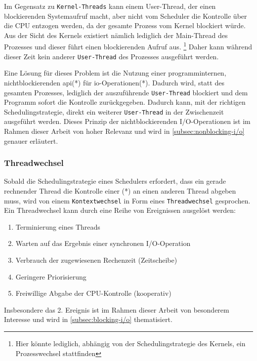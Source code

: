 Im Gegensatz zu \verb|Kernel-Threads| kann einem User-Thread, der einen blockierenden Systemaufruf macht, aber nicht vom Scheduler die Kontrolle über die CPU
entzogen werden, da der gesamte Prozess vom Kernel blockiert würde. Aus der Sicht des Kernels existiert nämlich lediglich der Main-Thread des Prozesses und dieser
führt einen blockierenden Aufruf aus. \footnote{Hier könnte lediglich, abhängig von der Schedulingstrategie des Kernels, ein Prozesswechsel stattfinden}
Daher kann während dieser Zeit kein anderer \verb|User-Thread| des Prozesses ausgeführt werden.

Eine Lösung für dieses Problem ist die Nutzung einer programminternen, nichtblockierenden \acrshort{api}(*) für \gls{io}-Operationen(*).
Dadurch wird, statt des gesamten Prozesses, lediglich der auszuführende \verb|User-Thread| blockiert und dem Programm sofort
die Kontrolle zurückgegeben. Dadurch kann, mit der richtigen Schedulingstrategie, direkt ein weiterer \verb|User-Thread| in der Zwischenzeit ausgeführt werden.
\parencite[Kapitel 2.2.4]{Tanenbaum2016}
Dieses Prinzip der nichtblockierenden I/O-Operationen ist im Rahmen dieser Arbeit von hoher Relevanz und wird in \ref{subsec:nonblocking-i/o}
genauer erläutert.

\subsubsection{Threadwechsel}
\label{subsubsec:threadwechsel}
Sobald die Schedulingstrategie eines Schedulers erfordert, dass ein gerade rechnender Thread die Kontrolle einer (*) an
einen anderen Thread abgeben muss, wird von einem \verb|Kontextwechsel| in Form eines \verb|Threadwechsel| gesprochen.
Ein Threadwechsel kann durch eine Reihe von Ereignissen ausgelöst werden:
\begin{enumerate}
  \item Terminierung eines Threads
  \item Warten auf das Ergebnis einer synchronen I/O-Operation
  \item Verbrauch der zugewiesenen Rechenzeit (Zeitscheibe)
  \item Geringere Priorisierung
  \item Freiwillige Abgabe der CPU-Kontrolle (kooperativ)
\end{enumerate}

Insbesondere das 2. Ereignis ist im Rahmen dieser Arbeit von besonderem Interesse und wird in \ref{subsec:blocking-i/o} thematisiert.

